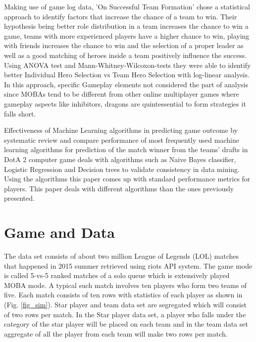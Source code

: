 \documentclass[conference]{IEEEtran}
\begin{document}
Making use of game log data, 'On Successful Team Formation' \cite{Pobiedina2013b} chose a statistical approach to identify factors that increase the chance of a team to win. Their hypothesis being better role distribution in a team increases the chance to win a game,     teams with more experienced players have a higher chance to win, playing with friends increases the chance to win and
the selection of a proper leader as well as a good matching of heroes inside a team positively influence the success. Using ANOVA test and Mann-Whitney-Wilcoxon-tests they were able to identify better Individual Hero Selection vs Team Hero Selection with log-linear analysis. In this approach, specific Gameplay elements not considered the part of analysis since MOBAs tend to be different from other online multiplayer games where gameplay aspects like inhibitors, dragons are quintessential to form strategies it falls short.
  
Effectiveness of Machine Learning algorithms in predicting game outcome by systematic review and compare performance of most frequently used machine learning algorithms for prediction of the match winner from the teams' drafts in DotA 2 computer game \cite{Semenov} deals with algorithms such as Naive Bayes classifier, Logistic Regression and Decision trees to validate consistency in data mining. Using the algorithms this paper comes up with standard performance metrics for players. This paper deals with different algorithms than the ones previously presented.

\section{Game and Data}
The data set consists of about two million League of Legends (LOL) matches that happened in 2015 summer retrieved using riots API system. The game mode is called 5-vs-5 ranked matches of a solo queue which is extensively played MOBA mode. A typical such match involves ten players who form two teams of five. Each match consists of ten rows with statistics of each player as shown in (Fig. \ref{fig_sim}). Star player and team data set are segregated which will consist of two rows per match. In the Star player data set, a player who falls under the category of the star player will be placed on each team and in the team data set aggregate of all the player from each team will make two rows per match.
\end{document}

